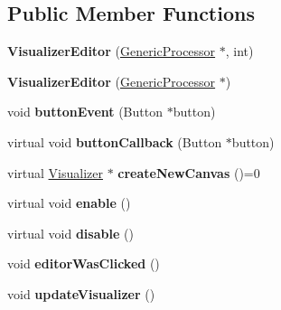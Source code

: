 \subsection*{Public Member Functions}
\begin{DoxyCompactItemize}
\item 
\hypertarget{classVisualizerEditor_a42310e08d09f3f6d933959b1af373eb8}{{\bfseries Visualizer\-Editor} (\hyperlink{classGenericProcessor}{Generic\-Processor} $\ast$, int)}\label{classVisualizerEditor_a42310e08d09f3f6d933959b1af373eb8}

\item 
\hypertarget{classVisualizerEditor_a0b39da0ca87e1ae2642787bc53d2772c}{{\bfseries Visualizer\-Editor} (\hyperlink{classGenericProcessor}{Generic\-Processor} $\ast$)}\label{classVisualizerEditor_a0b39da0ca87e1ae2642787bc53d2772c}

\item 
\hypertarget{classVisualizerEditor_a5f0dc2c7132660a5ce1fd9d5cbc9c6ff}{void {\bfseries button\-Event} (Button $\ast$button)}\label{classVisualizerEditor_a5f0dc2c7132660a5ce1fd9d5cbc9c6ff}

\item 
\hypertarget{classVisualizerEditor_a28603b8f37f5d74a064cee42981be368}{virtual void {\bfseries button\-Callback} (Button $\ast$button)}\label{classVisualizerEditor_a28603b8f37f5d74a064cee42981be368}

\item 
\hypertarget{classVisualizerEditor_ad9e8d76310366869e3f2f51ac4a2dc65}{virtual \hyperlink{classVisualizer}{Visualizer} $\ast$ {\bfseries create\-New\-Canvas} ()=0}\label{classVisualizerEditor_ad9e8d76310366869e3f2f51ac4a2dc65}

\item 
\hypertarget{classVisualizerEditor_a784c317c2b9bb06e25e287c4ecf0670e}{virtual void {\bfseries enable} ()}\label{classVisualizerEditor_a784c317c2b9bb06e25e287c4ecf0670e}

\item 
\hypertarget{classVisualizerEditor_a9277b0aa356ea41040b9c9960abda21b}{virtual void {\bfseries disable} ()}\label{classVisualizerEditor_a9277b0aa356ea41040b9c9960abda21b}

\item 
\hypertarget{classVisualizerEditor_a852c519636c0428a2d2b2b7219108f67}{void {\bfseries editor\-Was\-Clicked} ()}\label{classVisualizerEditor_a852c519636c0428a2d2b2b7219108f67}

\item 
\hypertarget{classVisualizerEditor_a11c5e6386531cff49e6babfeb18a8885}{void {\bfseries update\-Visualizer} ()}\label{classVisualizerEditor_a11c5e6386531cff49e6babfeb18a8885}

\end{DoxyCompactItemize}
